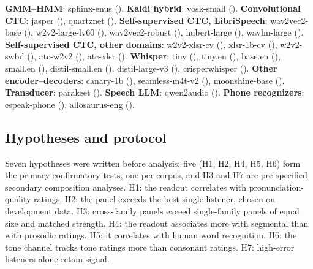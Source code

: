 \begin{table}[!ht]
\centering
\caption{English panel by family with mean phoneme error on the \so{}
training split. Empty outputs (moonshine, \%) score as
full deletion; checkpoint identifiers, decoder settings, and transcript
hashes are in the released inventory.}
\label{tab:panel}
\vspace{3pt}
\small
\begin{minipage}{\columnwidth}\sloppy
\textbf{GMM--HMM}: \textsf{sphinx-enus} ().
\textbf{Kaldi hybrid}: \textsf{vosk-small} ().
\textbf{Convolutional CTC}: \textsf{jasper} (), \textsf{quartznet} ().
\textbf{Self-supervised CTC, LibriSpeech}: \textsf{wav2vec2-base} (), \textsf{w2v2-large-lv60} (), \textsf{wav2vec2-robust} (), \textsf{hubert-large} (), \textsf{wavlm-large} ().
\textbf{Self-supervised CTC, other domains}: \textsf{w2v2-xlsr-cv} (), \textsf{xlsr-1b-cv} (), \textsf{w2v2-swbd} (), \textsf{atc-w2v2} (), \textsf{atc-xlsr} ().
\textbf{Whisper}: \textsf{tiny} (), \textsf{tiny.en} (), \textsf{base.en} (), \textsf{small.en} (), \textsf{distil-small.en} (), \textsf{distil-large-v3} (), \textsf{crisperwhisper} ().
\textbf{Other encoder--decoders}: \textsf{canary-1b} (), \textsf{seamless-m4t-v2} (), \textsf{moonshine-base} ().
\textbf{Transducer}: \textsf{parakeet} ().
\textbf{Speech LLM}: \textsf{qwen2audio} ().
\textbf{Phone recognizers}: \textsf{espeak-phone} (), \textsf{allosaurus-eng} ().
\end{minipage}
\end{table}

\subsection{Hypotheses and protocol}
Seven hypotheses were written before analysis; five (H1, H2, H4, H5, H6)
form the primary confirmatory tests, one per corpus, and H3 and H7 are
pre-specified secondary composition analyses. H1: the readout correlates
with pronunciation-quality ratings. H2: the panel exceeds the best single
listener, chosen on development data. H3: cross-family panels exceed
single-family panels of equal size and matched strength. H4: the readout
associates more with segmental than with prosodic ratings. H5: it correlates
with human word recognition. H6: the tone channel tracks tone ratings more
than consonant ratings. H7: high-error listeners alone retain signal.

